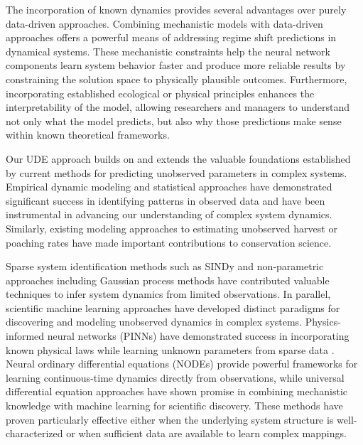 \documentclass[openacc]{rsproca_new}%
\begin{document}
The incorporation of known dynamics provides several advantages over purely data-driven approaches. Combining mechanistic models with data-driven approaches offers a powerful means of addressing regime shift predictions in dynamical systems. These mechanistic constraints help the neural network components learn system behavior faster and produce more reliable results by constraining the solution space to physically plausible outcomes. Furthermore, incorporating established ecological or physical principles enhances the interpretability of the model, allowing researchers and managers to understand not only what the model predicts, but also why those predictions make sense within known theoretical frameworks.

Our UDE approach builds on and extends the valuable foundations established by current methods for predicting unobserved parameters in complex systems. Empirical dynamic modeling \cite{Munch2024} and statistical approaches have demonstrated significant success in identifying patterns in observed data and have been instrumental in advancing our understanding of complex system dynamics. Similarly, existing modeling approaches   \cite{Agan_etal,FERREGUETTI2018133} to estimating unobserved harvest or poaching rates have made important contributions to conservation science.


Sparse system identification methods such as SINDy \cite{brunton2016discovering} and non-parametric approaches including Gaussian process methods \cite{alvarez2012kernels} have contributed valuable techniques to infer system dynamics from limited observations. In parallel, scientific machine learning approaches have developed distinct paradigms for discovering and modeling unobserved dynamics in complex systems. Physics-informed neural networks (PINNs) have demonstrated success in incorporating known physical laws while learning unknown parameters from sparse data \cite{raissi2019physics,karniadakis2021physics}. Neural ordinary differential equations (NODEs) \cite{chen2018neural} provide powerful frameworks for learning continuous-time dynamics directly from observations, while universal differential equation approaches \cite{rackauckas2020universal} have shown promise in combining mechanistic knowledge with machine learning for scientific discovery. These methods have proven particularly effective either when the underlying system structure is well-characterized or when sufficient data are available to learn complex mappings.
\end{document}

